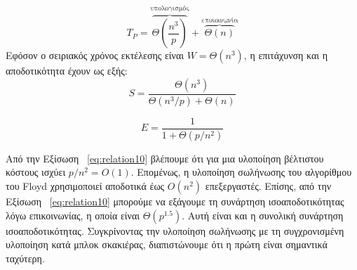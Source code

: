 \documentclass[12pt,a4paper]{article}
\begin{document}
\[
T_P = \overbrace{\Theta\left(\frac{n^3}{p}\right)}^{\text{υπολογισμός}} + \overbrace{\Theta(n)}^{\text{επικοινωνία}}
\]
Εφόσον ο σειριακός χρόνος εκτέλεσης είναι $W = \Theta(n^3)$, η επιτάχυνση και η αποδοτικότητα έχουν ως εξής:
\[
S = \frac{\Theta(n^3)}{\Theta(n^3/p) + \Theta(n)}
\]

\begin{equation}
E = \frac{1}{1 + \Theta(p/n^2)}
\label{eq:relation10}
\end{equation}

Από την Εξίσωση ~\ref{eq:relation10} βλέπουμε ότι για μια υλοποίηση βέλτιστου κόστους ισχύει $p/n^2 = O(1)$. Επομένως, η υλοποίηση σωλήνωσης του αλγορίθμου του \foreignlanguage{english}{Floyd} χρησιμοποιεί αποδοτικά έως $O(n^2)$ επεξεργαστές. Επίσης, από την Εξίσωση ~\ref{eq:relation10} μπορούμε να εξάγουμε τη συνάρτηση ισοαποδοτικότητας λόγω επικοινωνίας, η οποία είναι $\Theta(p^{1.5})$. Αυτή είναι και η συνολική συνάρτηση ισοαποδοτικότητας. Συγκρίνοντας την υλοποίηση σωλήνωσης με τη συγχρονισμένη υλοποίηση κατά μπλοκ σκακιέρας, διαπιστώνουμε ότι η πρώτη είναι σημαντικά ταχύτερη.
\end{document}
